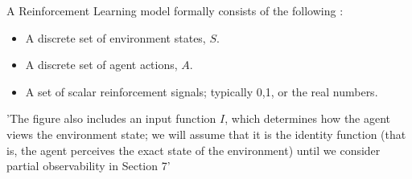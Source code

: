 

A Reinforcement Learning model formally consists of the following \cite{KaelblingLittmanMoore1996}:
\begin{itemize}
	\item A discrete set of environment states, $S$.
	\item A discrete set of agent actions, $A$.
	\item A set of scalar reinforcement signals; typically {0,1}, or the real numbers.
\end{itemize}

'The figure also includes an input function $I$, which determines how the agent views the environment state; we will assume that it is the identity function (that is, the agent perceives the exact state of the environment) until we consider partial observability in Section 7' \cite{KaelblingLittmanMoore1996}


